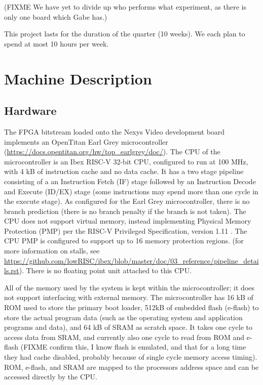 \documentclass{article}
\begin{document}
(FIXME We have yet to divide up who performs what experiment, as there is only one board which Gabe has.)

This project lasts for the duration of the quarter (10 weeks). We each plan to spend at most 10 hours per week.

\section{Machine Description}

\subsection{Hardware}
The FPGA bitstream loaded onto the Nexys Video development board implements an OpenTitan Earl Grey microcontroller (\url{https://docs.opentitan.org/hw/top_earlgrey/doc/}). The CPU of the microcontroller is an Ibex RISC-V 32-bit CPU, configured to run at 100 MHz, with 4 kB of instruction cache and no data cache. It has a two stage pipeline consisting of a an Instruction Fetch (IF) stage followed by an Instruction Decode and Execute (ID/EX) stage (some instructions may spend more than one cycle in the execute stage). As configured for the Earl Grey microcontroller, there is no branch prediction (there is no branch penalty if the branch is not taken). The CPU does not support virtual memory, instead implementing Physical Memory Protection (PMP) per the RISC-V Privileged Specification, version 1.11 \cite{riscv-priv}. The CPU PMP is configured to support up to 16 memory protection regions. (for more information on stalls, see \url{https://github.com/lowRISC/ibex/blob/master/doc/03\_reference/pipeline\_details.rst}). There is no floating point unit attached to this CPU.

All of the memory used by the system is kept within the microcontroller; it does not support interfacing with external memory. The microcontroller has 16 kB of ROM used to store the primary boot loader, 512kB of embedded flash (e-flash) to store the actual program data (such as the operating system and application programs and data), and 64 kB of SRAM as scratch space. It takes one cycle to access data from SRAM, and currently also one cycle to read from ROM and e-flash (FIXME confirm this, I know flash is emulated, and that for a long time they had cache disabled, probably because of single cycle memory access timing). ROM, e-flash, and SRAM are mapped to the processors address space and can be accessed directly by the CPU.
\end{document}
